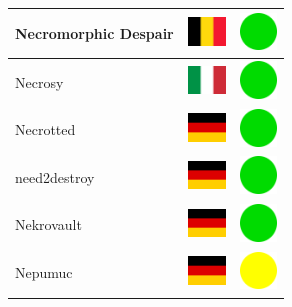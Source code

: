 \documentclass[12pt, a4paper, twoside]{report}
\begin{document}
\begin{center}
\begin{longtable}{|p{5cm}|p{2cm}|p{2cm}|}
 Necromorphic Despair                                       & \includegraphics[width=1cm]{../4x3/be} &   \includegraphics[width=1cm]{../likes/y} \\ \hline
 Necrosy                                                    & \includegraphics[width=1cm]{../4x3/it} &   \includegraphics[width=1cm]{../likes/y} \\ \hline
 Necrotted                                                  & \includegraphics[width=1cm]{../4x3/de} &   \includegraphics[width=1cm]{../likes/y} \\ \hline
 need2destroy                                               & \includegraphics[width=1cm]{../4x3/de} &   \includegraphics[width=1cm]{../likes/y} \\ \hline
 Nekrovault                                                 & \includegraphics[width=1cm]{../4x3/de} &   \includegraphics[width=1cm]{../likes/y} \\ \hline
 Nepumuc                                                    & \includegraphics[width=1cm]{../4x3/de} &   \includegraphics[width=1cm]{../likes/m} \\ \hline

\end{longtable}
\end{center}
\end{document}
